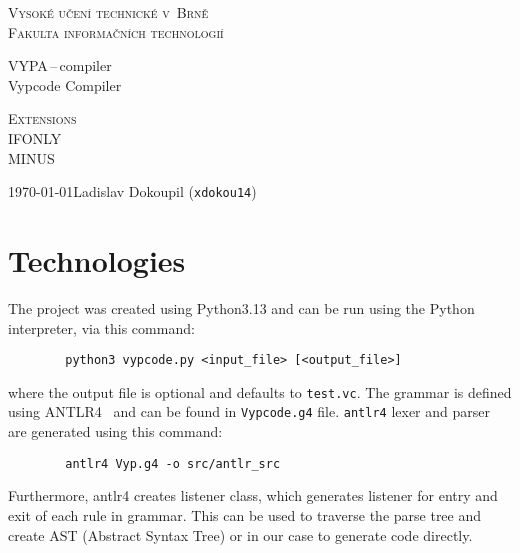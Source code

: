 \documentclass[a4paper,11pt]{article}
\begin{document}
	\begin{titlepage}
		\begin{center}
			\textsc{\Huge Vysoké učení technické v~Brně\\
				\vspace{0.4em}\huge Fakulta informačních technologií}


			{\LARGE VYPA\,--\,compiler\\
				\Huge Vypcode Compiler\\ \vspace{0.3em}}


			\textsc{{\LARGE Extensions}\\
				\vspace{0.4em} IFONLY \\
                    \vspace{0.4em} MINUS}



			{\Large \today \hfill Ladislav Dokoupil (\texttt{xdokou14})}
		\end{center}
	\end{titlepage}

    \section{Technologies}
    The project was created using Python3.13 and can be run using the Python interpreter, via this command:
    \begin{verbatim}
        python3 vypcode.py <input_file> [<output_file>]
    \end{verbatim}
    where the output file is optional and defaults to \texttt{test.vc}.
    The grammar is defined using ANTLR4~\cite{antlr} and can be found in \texttt{Vypcode.g4} file.
    \texttt{antlr4} lexer and parser are generated using this command:
    \begin{verbatim}
        antlr4 Vyp.g4 -o src/antlr_src
    \end{verbatim}
    Furthermore, antlr4 creates listener class, which generates listener for entry and exit of each rule in grammar.
    This can be used to traverse the parse tree and create AST (Abstract Syntax Tree) or in our case to generate code directly.
\end{document}
